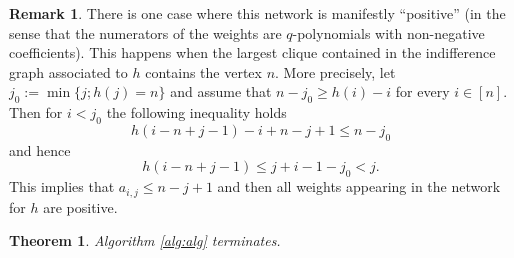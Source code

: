 \documentclass[10pt]{amsart}
\newtheorem{Thm}[Lem]{Theorem}
\theoremstyle{definition}
\newtheorem{Rem}[Lem]{Remark}
\begin{document}
\begin{Rem}
\label{rem:networkpos}
There is one case where this network is manifestly ``positive'' (in the sense that the numerators of the weights are $q$-polynomials with non-negative coefficients). This happens when the largest clique contained in the indifference graph associated to $h$ contains the vertex $n$. More precisely, let $j_0:=\min\{j;h(j)=n\}$ and assume that $n-j_0\geq h(i)-i$ for every $i \in [n]$. Then for $i<j_0$ the following inequality holds
\[
h(i-n+j-1)-i+n-j+1\leq n-j_0
\]
and hence
\[
h(i-n+j-1)\leq j+i-1-j_0<j.
\]
This implies that $a_{i,j}\leq n-j+1$ and then all weights appearing in the network for $h$ are positive.
\end{Rem}

\begin{Thm}
\label{thm:algterm}
Algorithm \ref{alg:alg} terminates.
\end{Thm}
\end{document}
